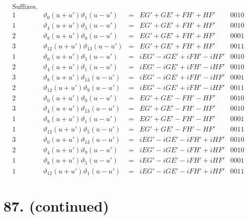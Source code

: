 \documentclass[11pt,a4paper]{article}
\newcommand{\uth}[1]{\vartheta_{#1}}
\begin{document}
\[
\begin{array}{ccccc}
\text{Suffixes.} & & & & \\
\hline
1 & \uth{0}(u+u')\uth{1}(u-u') &=& EG' + GE' + FH' + HF' & 0010 \\
1 & \uth{4}(u+u')\uth{5}(u-u') &=& EG' + GE' + FH' + HF' & 0010 \\
2 & \uth{8}(u+u')\uth{9}(u-u') &=& EG' + GE' + FH' + HF' & 0001 \\
3 & \uth{12}(u+u')\uth{13}(u-u') &=& EG' + GE' + FH' + HF' & 0011 \\
\hline
1 & \uth{0}(u+u')\uth{5}(u-u') &=& iEG' - iGE' + iFH' - iHF' & 0010 \\
2 & \uth{4}(u+u')\uth{1}(u-u') &=& iEG' - iGE' + iFH' - iHF' & 0010 \\
3 & \uth{8}(u+u')\uth{13}(u-u') &=& iEG' - iGE' + iFH' - iHF' & 0001 \\
2 & \uth{12}(u+u')\uth{9}(u-u') &=& iEG' - iGE' + iFH' - iHF' & 0011 \\
\hline
2 & \uth{0}(u+u')\uth{9}(u-u') &=& EG' + GE' - FH' - HF' & 0010 \\
3 & \uth{4}(u+u')\uth{13}(u-u') &=& EG' + GE' - FH' - HF' & 0010 \\
1 & \uth{8}(u+u')\uth{1}(u-u') &=& EG' + GE' - FH' - HF' & 0001 \\
1 & \uth{12}(u+u')\uth{5}(u-u') &=& EG' + GE' - FH' - HF' & 0011 \\
\hline
3 & \uth{0}(u+u')\uth{13}(u-u') &=& iEG' - iGE' - iFH' + iHF' & 0010 \\
2 & \uth{4}(u+u')\uth{9}(u-u') &=& iEG' - iGE' - iFH' + iHF' & 0010 \\
1 & \uth{8}(u+u')\uth{5}(u-u') &=& iEG' - iGE' - iFH' + iHF' & 0001 \\
1 & \uth{12}(u+u')\uth{1}(u-u') &=& iEG' - iGE' - iFH' + iHF' & 0011
\end{array}
\]

\newpage
\section*{87. (continued)}
\label{sec:87cont2}
\end{document}
